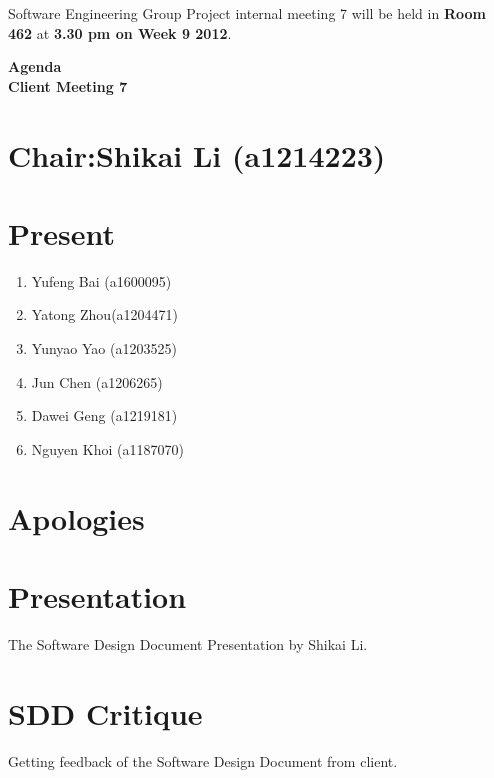 \documentclass[11pt, a4paper]{article}
\begin{document}
\noindent Software Engineering Group Project internal meeting 7 will be held in {\bf Room 462} at {\bf 3.30 pm on Week 9 2012}.


\vspace*{15pt}

\begin{center}
\huge \bf Agenda \\Client Meeting 7
\end{center}



\section*{Chair:Shikai Li (a1214223)}
\section*{Present}
\begin{enumerate}
\item Yufeng Bai (a1600095)
\item Yatong Zhou(a1204471)
\item Yunyao Yao (a1203525)
\item Jun Chen (a1206265)
\item Dawei Geng (a1219181)
\item Nguyen Khoi (a1187070)
\end{enumerate}
\section{Apologies}

\section{Presentation}
The Software Design Document Presentation by Shikai Li.

\section{SDD Critique}
Getting feedback of the Software Design Document from client. 
\end{document}
